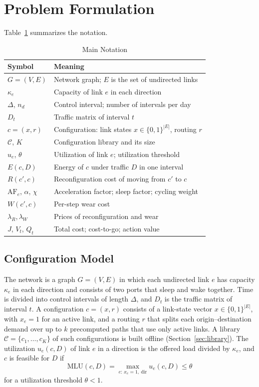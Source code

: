 \documentclass[journal]{IEEEtran}
\begin{document}
\section{Problem Formulation}\label{sec:problem}

Table~\ref{tab:notation} summarizes the notation.

\begin{table}[t]
\centering
\caption{Main Notation}
\label{tab:notation}
\footnotesize
\setlength{\tabcolsep}{3pt}
\begin{tabular}{@{}p{1.85cm}p{6.5cm}@{}}
\toprule
Symbol & Meaning \\
\midrule
$G=(V,E)$ & Network graph; $E$ is the set of undirected links \\
$\kappa_e$ & Capacity of link $e$ in each direction \\
$\Delta$, $n_d$ & Control interval; number of intervals per day \\
$D_t$ & Traffic matrix of interval $t$ \\
$c=(x,r)$ & Configuration: link states $x\in\{0,1\}^{|E|}$, routing $r$ \\
$\mathcal{C}$, $K$ & Configuration library and its size \\
$u_e$, $\theta$ & Utilization of link $e$; utilization threshold \\
$E(c,D)$ & Energy of $c$ under traffic $D$ in one interval \\
$R(c',c)$ & Reconfiguration cost of moving from $c'$ to $c$ \\
$\mathrm{AF}_e$, $\alpha$, $\chi$ & Acceleration factor; sleep factor; cycling weight \\
$W(c',c)$ & Per-step wear cost \\
$\lambda_R,\lambda_W$ & Prices of reconfiguration and wear \\
$J$, $V_t$, $Q_t$ & Total cost; cost-to-go; action value \\
\bottomrule
\end{tabular}
\end{table}

\subsection{Configuration Model}

The network is a graph $G=(V,E)$ in which each undirected link $e$ has capacity $\kappa_e$ in each direction and consists of two ports that sleep and wake together. Time is divided into control intervals of length $\Delta$, and $D_t$ is the traffic matrix of interval $t$. A configuration $c=(x,r)$ consists of a link-state vector $x\in\{0,1\}^{|E|}$, with $x_e=1$ for an active link, and a routing $r$ that splits each origin--destination demand over up to $k$ precomputed paths that use only active links. A library $\mathcal{C}=\{c_1,\dots,c_K\}$ of such configurations is built offline (Section~\ref{sec:library}). The utilization $u_e(c,D)$ of link $e$ in a direction is the offered load divided by $\kappa_e$, and $c$ is feasible for $D$ if
\begin{equation}\label{eq:mlu}
\mathrm{MLU}(c,D)=\max_{e:\,x_e=1,\ \mathrm{dir}}u_e(c,D)\le\theta
\end{equation}
for a utilization threshold $\theta<1$.
\end{document}
